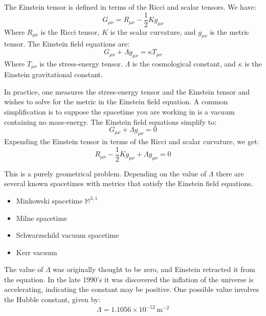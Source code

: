 \documentclass{beamer}
\begin{document}
    \begin{frame}
        The Einstein tensor is defined in terms of the Ricci and scalar tensors.
        We have:
        \begin{equation}
            G_{\mu\nu}=R_{\mu\nu}-\frac{1}{2}Kg_{\mu\nu}
        \end{equation}
        Where $R_{\mu\nu}$ is the Ricci tensor, $K$ is the scalar curvature,
        and $g_{\mu\nu}$ is the metric tensor. The Einstein field equations are:
        \begin{equation}
            G_{\mu\nu}+\Lambda{g}_{\mu\nu}=\kappa{T}_{\mu\nu}
        \end{equation}
        Where $T_{\mu\nu}$ is the stress-energy tensor. $\Lambda$ is the
        cosmological constant, and $\kappa$ is the Einstein gravitational
        constant.
    \end{frame}
    \begin{frame}
        In practice, one measures the stress-energy tensor and the Einstein
        tensor and wishes to solve for the metric in the Einstein field
        equation. A common simplification is to suppose the spacetime you are
        working in is a vacuum containing no mass-energy. The Einstein field
        equations simplify to:
        \begin{equation}
            G_{\mu\nu}+\Lambda{g}_{\mu\nu}=0
        \end{equation}
        Expending the Einstein tensor in terms of the Ricci and scalar
        curvature, we get:
        \begin{equation}
            R_{\mu\nu}-\frac{1}{2}Kg_{\mu\nu}+\Lambda{g}_{\mu\nu}=0
        \end{equation}
    \end{frame}
    \begin{frame}
        This is a purely geometrical problem. Depending on the value of
        $\Lambda$ there are several known spacetimes with metrics that satisfy
        the Einstein field equations.
        \begin{itemize}
            \item Minkowski spacetime $\mathbb{M}^{3,1}$
            \item Milne spacetime
            \item Schwarzschild vacuum spacetime
            \item Kerr vacuum
        \end{itemize}
        The value of $\Lambda$ was originally thought to be zero, and Einstein
        retracted it from the equation. In the late 1990's it was discovered
        the inflation of the universe is accelerating, indicating the constant
        may be positive. One possible value involves the Hubble constant, given
        by:
        \begin{equation}
            \Lambda=1.1056\times{10}^{-52}\,\textrm{m}^{-2}
        \end{equation}
    \end{frame}
\end{document}
